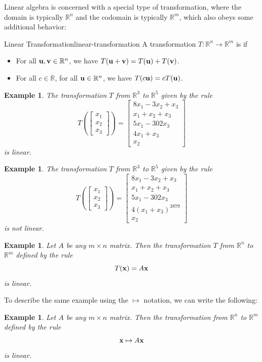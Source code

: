 \documentclass{book}
\newcounter{ekcounter}%
\theoremstyle{ekimcustom}
\newtheorem{example}[ekcounter]{Example}
\newcommand\defn[1]{{\color{blue}{\bf #1}}}
\begin{document}
Linear algebra is concerned with a special type of transformation, where the domain is typically $\mathbb{R}^n$ and the codomain is typically $\mathbb{R}^m$, which also obeys some additional behavior:
\begin{bdefinition}{Linear Transformation}{linear-transformation}
A transformation $T : \mathbb{R}^n \to \mathbb{R}^m$ is \defn{linear} if
\begin{itemize}
\item For all ${\bf u},{\bf v} \in \mathbb{R}^n$, we have $T({\bf u}+{\bf v}) = T({\bf u}) + T({\bf v})$.
\item For all $c \in \mathbb{R}$, for all ${\bf u} \in \mathbb{R}^n$, we have $T(c{\bf u}) = cT({\bf u})$.
\end{itemize}
\end{bdefinition}
\begin{example}
The transformation $T$ from $\mathbb{R}^3$ to $\mathbb{R}^5$ given by the rule
\[ T\left(
\left[
\begin{array}{c}
x_1 \\x_2 \\x_3 \end{array}
\right]
\right)
=
\left[
\begin{array}{c}
8x_1 - 3x_2 + x_3\\
x_1 + x_2 + x_3\\
5x_1 -  302x_3\\
4x_1 + x_3\\
x_2 
\end{array}
\right]
\]
is linear.
\end{example}

\begin{example}
The transformation $T$ from $\mathbb{R}^3$ to $\mathbb{R}^5$ given by the rule
\[ T\left(
\left[
\begin{array}{c}
x_1 \\x_2 \\x_3 \end{array}
\right]
\right)
=
\left[
\begin{array}{c}
8x_1 - 3x_2 + x_3\\
x_1 + x_2 + x_3\\
5x_1 -  302x_3\\
4(x_1 + x_3)^{3879}\\
x_2 
\end{array}
\right]
\]
is not linear.
\end{example}

\begin{example}
Let $A$ be any $m \times n$ matrix. Then the transformation $T$ from $\mathbb{R}^n$ to $\mathbb{R}^m$ defined by the rule
\[ T({\bf x}) = A{\bf x}\]
is linear.
\end{example}
To describe the same example using the $\mapsto$ notation, we can write the following:
\begin{example}
Let $A$ be any $m \times n$ matrix. Then the transformation from $\mathbb{R}^n$ to $\mathbb{R}^m$ defined by the rule 
\[{\bf x} \mapsto A{\bf x}\]
is linear.
\end{example}
\end{document}
